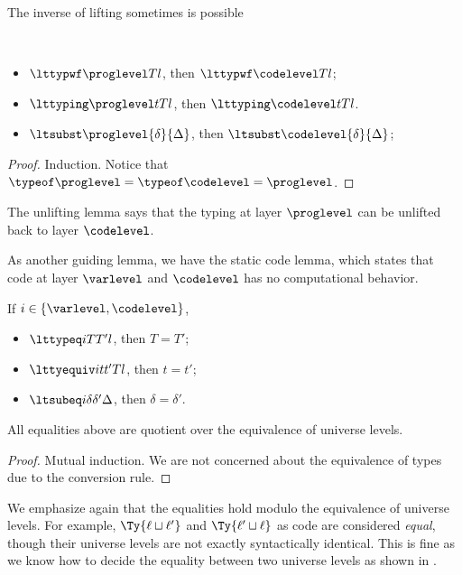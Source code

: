 The inverse of lifting sometimes is possible
\begin{lemma}[Unlifting] $ $
  \begin{itemize}
  \item $\lttypwf \proglevel T l$, then $\lttypwf \codelevel T l$;
  \item $\lttyping \proglevel t T l$, then $\lttyping \codelevel t T l$.
  \item $\ltsubst \proglevel{\delta}{\Delta}$, then $\ltsubst \codelevel{\delta}{\Delta}$;
  \end{itemize}
\end{lemma}
\begin{proof}
  Induction. %
  Notice that $\typeof \proglevel = \typeof \codelevel = \proglevel$. 
\end{proof}
The unlifting lemma says that the typing at layer $\proglevel$ can be unlifted back to layer
$\codelevel$. %

As another guiding lemma, we have the static code lemma, which states that code at
layer $\varlevel$ and $\codelevel$ has no computational behavior.
\begin{lemma} If $i \in \{\varlevel, \codelevel\}$,
  \begin{itemize}
  \item $\lttypeq i T{T'} l$, then $T = T'$;
  \item $\lttyequiv i t{t'} T l$, then $t = t'$;
  \item $\ltsubeq i{\delta}{\delta'}{\Delta}$, then $\delta = \delta'$.
  \end{itemize}
  All equalities above are quotient over the equivalence of universe levels.
\end{lemma}
\begin{proof}
  Mutual induction. %
  We are not concerned about the equivalence of types due to the conversion rule.
\end{proof}
We emphasize again that the equalities hold modulo the equivalence of universe
levels. %
For example, $\Ty{\ell \sqcup \ell'}$ and $\Ty{\ell' \sqcup \ell}$ as code are
considered \emph{equal}, though their universe levels are not exactly syntactically
identical. %
This is fine as we know how to decide the equality between two universe levels as
shown in . 

